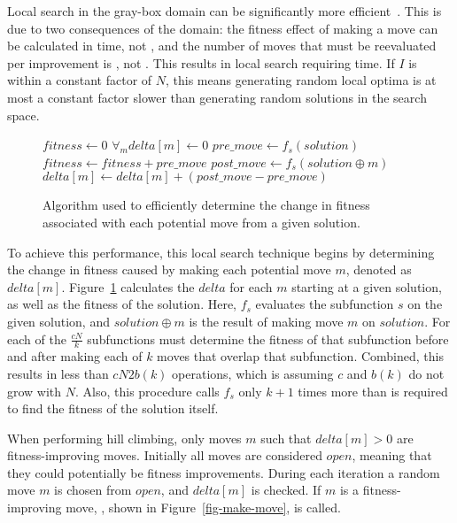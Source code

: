 Local search in the gray-box domain can be significantly more efficient~\cite{whitley:2013:greedy}. This is due
to two consequences of the domain: the fitness effect of making a move can be calculated in  time, not ,
and the number of moves that must be reevaluated per improvement is , not . This results in local
search requiring  time. If $I$ is within a constant factor of $N$, this means generating random local
optima is at most a constant factor slower than generating random solutions in the search space.

\begin{figure}
  \begin{algorithmic}[1]
    \State $fitness \leftarrow 0$
    \State $\forall_{m} delta[m] \leftarrow 0$
      \State $pre\_move \leftarrow f_s(solution)$
      \State $fitness \leftarrow fitness + pre\_move$
        \State $post\_move \leftarrow f_s(solution \oplus m)$
        \State $delta[m] \leftarrow delta[m] + (post\_move - pre\_move)$
      \EndFor
    \EndFor
  \EndProcedure
\end{algorithmic}
  \caption{Algorithm used to efficiently determine the change in fitness
           associated with each potential move from a given solution.}
  \label{fig-initialize-delta}
\end{figure}

To achieve this performance, this local search technique begins by
determining the change in fitness caused by making each potential move
$m$, denoted as $delta[m]$. Figure~\ref{fig-initialize-delta}
calculates the $delta$ for each $m$ starting at a given solution, as
well as the fitness of the solution.  Here, $f_s$ evaluates the
subfunction $s$ on the given solution, and $solution \oplus m$ is the
result of making move $m$ on $solution$.  For each of the
$\frac{cN}{k}$ subfunctions  must determine
the fitness of that subfunction before and after making each of $k$
moves that overlap that subfunction. Combined, %
this results in less than $cN2b(k)$ operations, which is 
assuming $c$ and $b(k)$ do not grow with $N$.  Also, this procedure
calls $f_s$ only $k+1$ times more than is required to find the fitness
of the solution itself.

When performing hill climbing, only moves $m$ such that $delta[m] > 0$
are fitness-improving moves. Initially all moves are considered
$open$, meaning that they could potentially be fitness
improvements. 
During each iteration a random move $m$ is chosen from $open$,
and $delta[m]$ is checked. If $m$ is a fitness-improving move,
, shown in Figure~\ref{fig-make-move}, is called.

